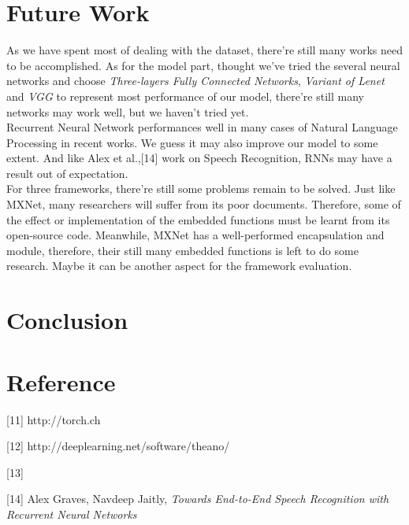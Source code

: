 \documentclass[12pt]{article}
\begin{document}
\section{Future Work}
As we have spent most of dealing with the dataset, there're still many works need to be accomplished.
As for the model part, thought we've tried the several neural networks and choose {\it Three-layers Fully Connected Networks}, {\it Variant of Lenet} and {\it VGG} to represent most performance of our model, there're still many networks may work well, but we haven't tried yet.\\
Recurrent Neural Network performances well in many cases of Natural Language Processing in recent works. We guess it may also improve our model to some extent. And like Alex et al.,[14] work on Speech Recognition, RNNs may have a result out of expectation.\\
For three frameworks, there're still some problems remain to be solved. Just like MXNet, many researchers will suffer from its poor documents. Therefore, some of the effect or implementation of the embedded functions must be learnt from its open-source code. Meanwhile, MXNet has a well-performed encapsulation and module, therefore, their still many embedded functions is left to do some research. Maybe it can be another aspect for the framework evaluation.\\


\section{Conclusion}

\section{Reference}
[11] http://torch.ch

[12] http://deeplearning.net/software/theano/

[13] 

[14] Alex Graves, Navdeep Jaitly, {\it Towards End-to-End Speech Recognition with Recurrent Neural Networks}
\end{document}
